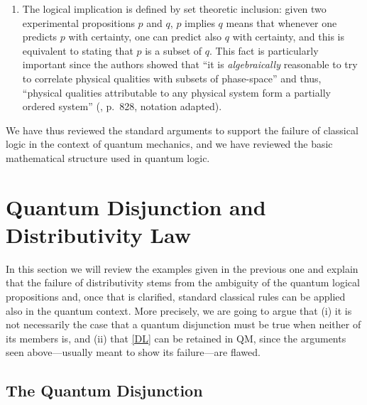 \documentclass[11pt, executivepaper]{article}
\begin{document}
\begin{enumerate}
\item The logical implication is defined by set theoretic inclusion: given two experimental propositions $p$ and $q$, 
$p$ implies $q$ means that whenever one predicts $p$ with certainty, one can predict also $q$ with certainty, and this is equivalent to stating that $p$ is a subset of $q$. This fact is particularly important since the authors showed that ``it is \emph{algebraically} reasonable to try to correlate physical qualities with subsets of phase-space'' and thus, ``physical qualities attributable to any physical system form a partially ordered system'' (\cite{vonNeumann:1936}, p.\ 828, notation adapted).
\end{enumerate}

We have thus reviewed the standard arguments to support the failure of classical logic in the context of quantum mechanics, and we have reviewed the basic mathematical structure used in quantum logic.


\section{Quantum Disjunction and Distributivity Law}
\label{Motivations}

In this section we will review the examples given in the previous one and explain that the failure of distributivity stems from the ambiguity of the quantum logical propositions and, once that is clarified, standard classical rules can be applied also in the quantum context. More precisely, we are going to argue that (i) it is not necessarily the case that a quantum disjunction must be true when neither of its members is, and (ii) that \eqref{DL} can be retained in QM, since the arguments seen above---usually meant to show its failure---are flawed.

\subsection{The Quantum Disjunction}
\end{document}
